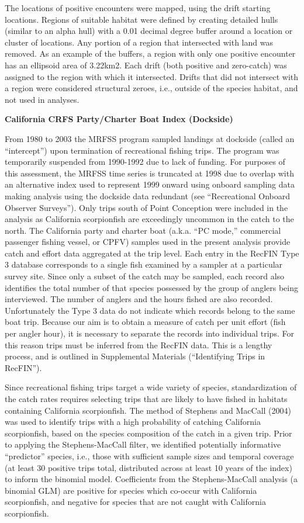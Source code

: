 \documentclass[12pt,]{article}
\begin{document}
The locations of positive encounters were mapped, using the drift
starting locations. Regions of suitable habitat were defined by creating
detailed hulls (similar to an alpha hull) with a 0.01 decimal degree
buffer around a location or cluster of locations. Any portion of a
region that intersected with land was removed. As an example of the
buffers, a region with only one positive encounter has an ellipsoid area
of 3.22km2. Each drift (both positive and zero-catch) was assigned to
the region with which it intersected. Drifts that did not intersect with
a region were considered structural zeroes, i.e., outside of the species
habitat, and not used in analyses.

\textbf{California CRFS Party/Charter Boat Index (Dockside)}

From 1980 to 2003 the MRFSS program sampled landings at dockside (called
an ``intercept'') upon termination of recreational fishing trips. The
program was temporarily suspended from 1990-1992 due to lack of funding.
For purposes of this assessment, the MRFSS time series is truncated at
1998 due to overlap with an alternative index used to represent 1999
onward using onboard sampling data making analysis using the dockside
data redundant (see ``Recreational Onboard Observer Surveys''). Only
trips south of Point Conception were included in the analysis as
California scorpionfish are exceedingly uncommon in the catch to the
north. The California party and charter boat (a.k.a. ``PC mode,''
commercial passenger fishing vessel, or CPFV) samples used in the
present analysis provide catch and effort data aggregated at the trip
level. Each entry in the RecFIN Type 3 database corresponds to a single
fish examined by a sampler at a particular survey site. Since only a
subset of the catch may be sampled, each record also identifies the
total number of that species possessed by the group of anglers being
interviewed. The number of anglers and the hours fished are also
recorded. Unfortunately the Type 3 data do not indicate which records
belong to the same boat trip. Because our aim is to obtain a measure of
catch per unit effort (fish per angler hour), it is necessary to
separate the records into individual trips. For this reason trips must
be inferred from the RecFIN data. This is a lengthy process, and is
outlined in Supplemental Materials (``Identifying Trips in RecFIN'').

Since recreational fishing trips target a wide variety of species,
standardization of the catch rates requires selecting trips that are
likely to have fished in habitats containing California scorpionfish.
The method of Stephens and MacCall (2004) was used to identify trips
with a high probability of catching California scorpionfish, based on
the species composition of the catch in a given trip. Prior to applying
the Stephens-MacCall filter, we identified potentially informative
``predictor'' species, i.e., those with sufficient sample sizes and
temporal coverage (at least 30 positive trips total, distributed across
at least 10 years of the index) to inform the binomial model.
Coefficients from the Stephens-MacCall analysis (a binomial GLM) are
positive for species which co-occur with California scorpionfish, and
negative for species that are not caught with California scorpionfish.
\end{document}

